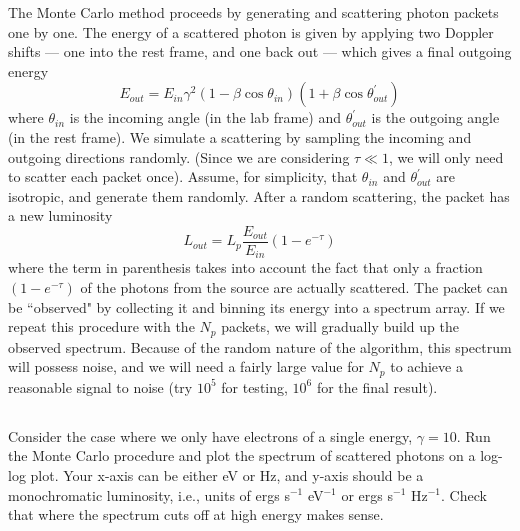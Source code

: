 \documentclass[11pt]{article}
\begin{document}
The Monte Carlo method proceeds by generating and scattering photon packets one
by one. The energy of a scattered photon is given by applying two Doppler
shifts --- one into the rest frame, and one back out --- which gives a final
outgoing energy
\begin{equation}
E_{out}=E_{in}\gamma^2(1-\beta\cos\theta_{in})(1+\beta\cos\theta^\prime_{out})
\end{equation}
where $\theta_{in}$ is the incoming angle (in the lab frame) and
$\theta^\prime_{out}$ is the outgoing angle (in the rest frame).  We simulate
a scattering by sampling the incoming and outgoing directions randomly. (Since
we are considering $\tau\ll1$, we will only need to scatter each packet once).
Assume, for simplicity, that $\theta_{in}$ and $\theta^\prime_{out}$ are isotropic,
and generate them randomly.  After a random scattering, the packet has a new luminosity
\begin{equation}
L_{out} = L_p\frac{E_{out}}{E_{in}}(1-e^{-\tau})
\end{equation}
where the term in parenthesis takes into account the fact that only a fraction
$(1-e^{-\tau})$ of the photons from the source are actually scattered.
The packet can be ``observed" by collecting it and binning
its energy into a spectrum array. If we repeat this procedure with 
the $N_p$ packets, we will gradually build up the observed spectrum. 
Because of the random nature of the algorithm, this spectrum will 
possess noise, and we will need a fairly large value for 
$N_p$ to achieve a reasonable signal to noise (try $10^5$ for testing,
$10^6$ for the final result).

\subsection{}
Consider the case where we only have electrons of a single energy, $\gamma=10$. Run
the Monte Carlo procedure and plot the spectrum of scattered photons on a
log-log plot. Your x-axis can be either eV or Hz, and y-axis should be a
monochromatic luminosity, i.e., units of ergs s$^{-1}$ eV$^{-1}$ or ergs s$^{-1}$ Hz$^{-1}$. 
Check that where the spectrum cuts off at
high energy makes sense.
\end{document}
